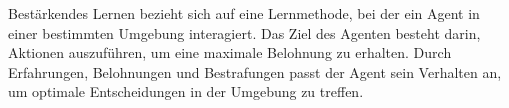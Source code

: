 Bestärkendes Lernen bezieht sich auf eine Lernmethode, bei der ein Agent in
einer bestimmten Umgebung interagiert. Das Ziel des Agenten besteht darin,
Aktionen auszuführen, um eine maximale Belohnung zu erhalten. Durch
Erfahrungen, Belohnungen und Bestrafungen passt der Agent sein Verhalten an, um
optimale Entscheidungen in der Umgebung zu treffen.